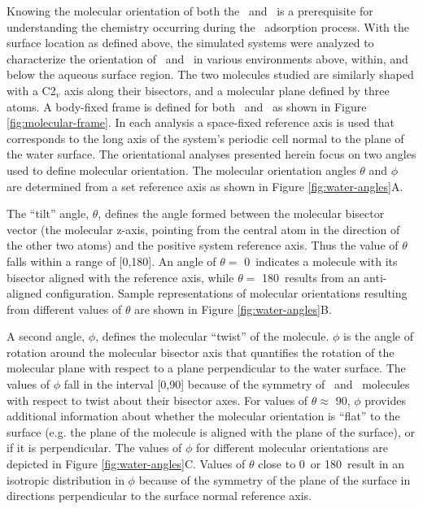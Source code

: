 Knowing the molecular orientation of both the \wat~and \suldiox~is a prerequisite for understanding the chemistry occurring during the \suldiox~adsorption process. With the surface location as defined above, the simulated systems were analyzed to characterize the orientation of \wat~and \suldiox~in various environments above, within, and below the aqueous surface region. The two molecules studied are similarly shaped with a C2$_v$ axis along their bisectors, and a molecular plane defined by three atoms. A body-fixed frame is defined for both \wat~and \suldiox~as shown in Figure \ref{fig:molecular-frame}. In each analysis a space-fixed reference axis is used that corresponds to the long axis of the system's periodic cell normal to the plane of the water surface. The orientational analyses presented herein focus on two angles used to define molecular orientation. The molecular orientation angles $\theta$ and $\phi$ are determined from a set reference axis as shown in Figure \ref{fig:water-angles}A.
	
	The ``tilt'' angle, $\theta$, defines the angle formed between the molecular bisector vector (the molecular z-axis, pointing from the central atom in the direction of the other two atoms) and the positive system reference axis. Thus the value of $\theta$ falls within a range of [0\textdegree,180\textdegree]. An angle of $\theta=$ 0\textdegree~indicates a molecule with its bisector aligned with the reference axis, while $\theta=$ 180\textdegree~results from an anti-aligned configuration. Sample representations of molecular orientations resulting from different values of $\theta$ are shown in Figure \ref{fig:water-angles}B.
	
	A second angle, $\phi$, defines the molecular ``twist'' of the molecule. $\phi$ is the angle of rotation around the molecular bisector axis that quantifies the rotation of the molecular plane with respect to a plane perpendicular to the water surface. The values of $\phi$ fall in the interval [0\textdegree,90\textdegree] because of the symmetry of \wat~and \suldiox~molecules with respect to twist about their bisector axes. For values of $\theta \approx$ 90\textdegree, $\phi$ provides additional information about whether the molecular orientation is ``flat'' to the surface (e.g. the plane of the molecule is aligned with the plane of the surface), or if it is perpendicular. The values of $\phi$ for different molecular orientations are depicted in Figure \ref{fig:water-angles}C. %
	Values of $\theta$ close to 0\textdegree~or 180\textdegree~result in an isotropic distribution in $\phi$ because of the symmetry of the plane of the surface in directions perpendicular to the surface normal reference axis.

